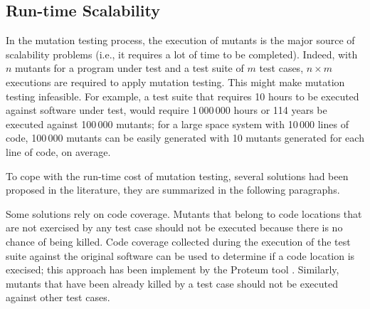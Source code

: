 
\subsection{Run-time Scalability}
\label{sec:opt:execution}

In the mutation testing process, the execution of mutants is the major source of scalability problems (i.e., it requires a lot of time to be completed). Indeed, with $n$ mutants for a program under test and a test suite of $m$ test cases, $n \times m$ executions are required to apply mutation testing.
This might make mutation testing infeasible. For example, a test suite that requires 10 hours to be executed against software under test, would require 1\,000\,000 hours or 114 years be executed against 100\,000 mutants; for a large space system with 10\,000 lines of code, 100\,000 mutants can be easily generated  with 10 mutants generated for each line of code, on average.

To cope with the run-time cost of mutation testing, several solutions had been proposed in the literature, they are summarized in the following paragraphs.

Some solutions rely on code coverage. Mutants that belong to code locations that are not exercised by any test case should not be executed because there is no chance of being killed. Code coverage collected during the execution of the test suite against the original software can be used to determine if a code location is execised; this approach has been implement by the Proteum tool \cite{delamaro1996proteum}.
Similarly, mutants that have been already killed by a test case should not be executed against other test cases.

